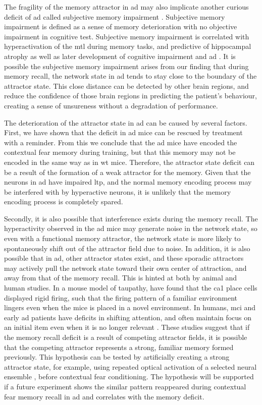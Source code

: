 The fragility of the memory attractor in \gls{ad} may also implicate another curious deficit of \gls{ad} called subjective memory impairment \citep{jahn13}. Subjective memory impairment is defined as a sense of memory deterioration with no objective impairment in cognitive test. Subjective memory impairment is correlated with hyperactivation of the \gls{mtl} during memory tasks, and predictive of hippocampal atrophy as well as later development of cognitive impairment and \gls{ad} \citep{jahn13}. It is possible the subjective memory impairment arises from our finding that during memory recall, the network state in \gls{ad} tends to stay close to the boundary of the attractor state. This close distance can be detected by other brain regions, and reduce the confidence of those brain regions in predicting the patient's behaviour, creating a sense of unsureness without a degradation of performance.  

The deterioration of the attractor state in \gls{ad} can be caused by several factors. First, we have shown that the deficit in \gls{ad} mice can be rescued by \tglu{} treatment with a reminder. From this we conclude that the \gls{ad} mice have encoded the contextual fear memory during training, but that this memory may not be encoded in the same way as in \gls{wt} mice. Therefore, the attractor state deficit can be a result of the formation of a weak attractor for the memory. Given that the neurons in \gls{ad} have impaired \gls{ltp}, and the normal memory encoding process may be interfered with by hyperactive neurons, it is unlikely that the memory encoding process is completely spared. 

Secondly, it is also possible that interference exists during the memory recall. The hyperactivity observed in the \gls{ad} mice may generate noise in the network state, so even with a functional memory attractor, the network state is more likely to spontaneously shift out of the attractor field due to noise. In addition, it is also possible that in \gls{ad}, other attractor states exist, and these sporadic attractors may actively pull the network state toward their own center of attraction, and away from that of the memory recall. This is hinted at both by animal and human studies. In a mouse model of taupathy, \citet{cheng13} have found that the \gls{ca1} place cells displayed rigid firing, such that the firing pattern of a familiar environment lingers even when the mice is placed in a novel environment. In humans, \gls{mci} and early \gls{ad} patients have deficits in shifting attention, and often maintain focus on an initial item even when it is no longer relevant \citep{perry99}. These studies suggest that if the memory recall deficit is a result of competing attractor fields, it is possible that the competing attractor represents a strong, familiar memory formed previously. This hypothesis can be tested by artificially creating a strong attractor state, for example, using repeated optical activation of a selected neural ensemble \citep{carrillo-reid16}, before contextual fear conditioning. The hypothesis will be supported if a future experiment shows the similar pattern reappeared during contextual fear memory recall in \gls{ad} and correlates with the memory deficit. 

